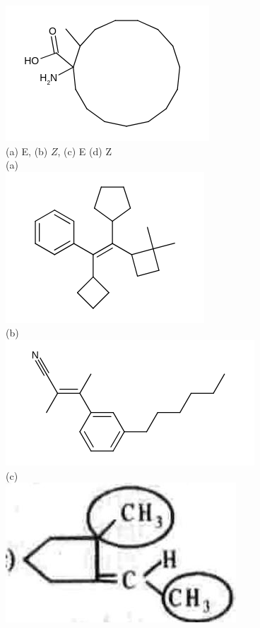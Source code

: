 \documentclass[10pt]{article}
\begin{document}
\includegraphics{smile-f99b3d53c4786f4d09468fe3a08133231dfb5a2b}\\
(a) E, (b) $Z$, (c) E (d) Z\\
(a)\\
\includegraphics{smile-84dac5529ead5e0cf9f85f8cf62d3f1da53e5616}\\
(b)\\
\includegraphics{smile-436fa3161dab573103b2f78e05154bae34df83a2}\\
(c)\\
\includegraphics[max width=\textwidth, center]{2025_01_28_8470952b98110cec3aabg-167(1)}
\end{document}

